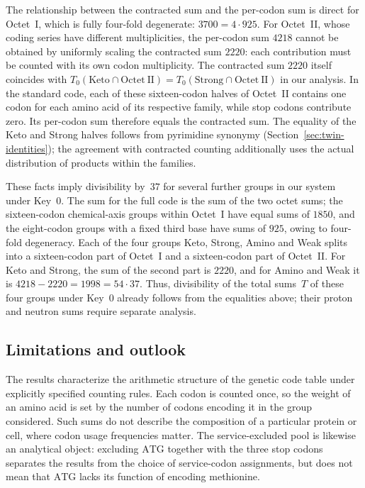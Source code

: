 \documentclass[11pt,a4paper]{article}
\renewcommand{\_}{\origunderscore\allowbreak}
\begin{document}
The relationship between the contracted sum and the per-codon
sum is direct for Octet~I, which is fully four-fold degenerate:
$3700 = 4 \cdot 925$. For Octet~II, whose coding series have
different multiplicities, the per-codon sum $4218$
cannot be obtained by uniformly scaling the contracted sum $2220$:
each contribution must be counted with its own codon multiplicity.
The contracted sum $2220$ itself coincides with
$T_{0}(\mathrm{Keto} \cap
\mathrm{Octet~II}) = T_{0}(\mathrm{Strong} \cap
\mathrm{Octet~II})$ in our analysis.
In the standard code, each of these sixteen-codon halves
of Octet~II contains one codon for each amino acid of its
respective family, while stop codons contribute zero.
Its per-codon sum therefore equals the contracted sum.
The equality of the Keto and Strong halves follows from
pyrimidine synonymy
(Section~\ref{sec:twin-identities}); the agreement with
contracted counting additionally uses the actual distribution
of products within the families.

These facts imply divisibility by~$37$ for several further
groups in our system under Key~0. The sum for the full code
is the sum of the two octet sums; the sixteen-codon chemical-axis
groups within Octet~I have equal sums of $1850$, and the
eight-codon groups with a fixed third base have sums of
$925$, owing to four-fold degeneracy.
Each of the four groups Keto, Strong, Amino and Weak
splits into a sixteen-codon part of Octet~I and a
sixteen-codon part of Octet~II. For Keto and Strong,
the sum of the second part is $2220$, and for Amino
and Weak it is $4218-2220=1998=54\cdot37$.
Thus, divisibility of the total sums~$T$ of these four groups
under Key~0 already follows from the equalities above;
their proton and neutron sums require separate analysis.

\subsection{Limitations and outlook}
\label{sec:discussion-limitations}

The results characterize the arithmetic structure of the
genetic code table under explicitly specified counting rules.
Each codon is counted once, so the weight of an amino acid
is set by the number of codons encoding it in the group
considered. Such sums do not describe the composition of a
particular protein or cell, where codon usage frequencies
matter. The service-excluded pool is likewise an analytical
object: excluding $\mathrm{ATG}$ together with the three stop
codons separates the results from the choice of service-codon
assignments, but does not mean that $\mathrm{ATG}$ lacks its
function of encoding methionine.
\end{document}
